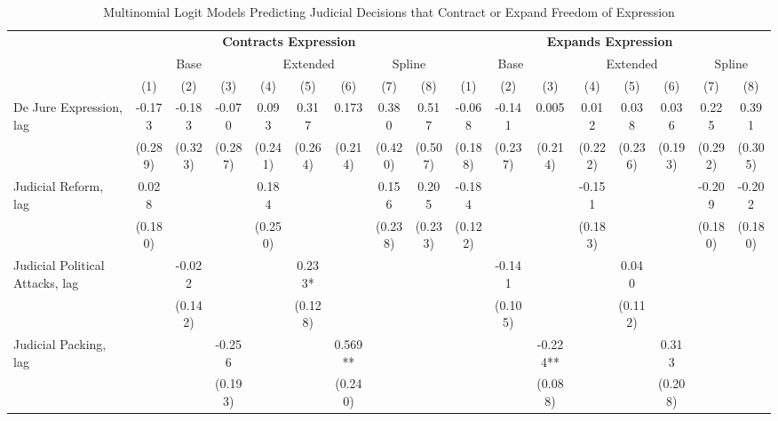 \begin{table}[htbp]
\centering

\caption{Multinomial Logit Models Predicting Judicial Decisions that Contract or Expand Freedom of Expression}
\label{tab:mnl_expression_main}

\scriptsize
\setlength{\tabcolsep}{2pt}
\begin{tabular}{lcccccccccccccccc}
\toprule

 & \multicolumn{8}{c}{\textbf{Contracts Expression}} & \multicolumn{8}{c}{\textbf{Expands Expression}} \\
\cmidrule(lr){2-9}
\cmidrule(lr){10-17}

 & \multicolumn{3}{c}{Base} & \multicolumn{3}{c}{Extended} & \multicolumn{2}{c}{Spline} & \multicolumn{3}{c}{Base} & \multicolumn{3}{c}{Extended} & \multicolumn{2}{c}{Spline} \\
\cmidrule(lr){2-4}
\cmidrule(lr){5-7}
\cmidrule(lr){8-9}
\cmidrule(lr){10-12}
\cmidrule(lr){13-15}
\cmidrule(lr){16-17}

 & (1) & (2) & (3) & (4) & (5) & (6) & (7) & (8) & (1) & (2) & (3) & (4) & (5) & (6) & (7) & (8) \\

\midrule

De Jure Expression, lag & -0.173 & -0.183 & -0.070 & 0.093 & 0.317 & 0.173 & 0.380 & 0.517 & -0.068 & -0.141 & 0.005 & 0.012 & 0.038 & 0.036 & 0.225 & 0.391 \\
\vspace{0.5cm}
 & (0.289) & (0.323) & (0.287) & (0.241) & (0.264) & (0.214) & (0.420) & (0.507) & (0.188) & (0.237) & (0.214) & (0.222) & (0.236) & (0.193) & (0.292) & (0.305) \\

Judicial Reform, lag & 0.028 &  &  & 0.184 &  &  & 0.156 & 0.205 & -0.184 &  &  & -0.151 &  &  & -0.209 & -0.202 \\
\vspace{0.1cm}
 & (0.180) &  &  & (0.250) &  &  & (0.238) & (0.233) & (0.122) &  &  & (0.183) &  &  & (0.180) & (0.180) \\

Judicial Political Attacks, lag &  & -0.022 &  &  & 0.233* &  &  &  &  & -0.141 &  &  & 0.040 &  &  &  \\
\vspace{0.1cm}
 &  & (0.142) &  &  & (0.128) &  &  &  &  & (0.105) &  &  & (0.112) &  &  &  \\

Judicial Packing, lag &  &  & -0.256 &  &  & 0.569** &  &  &  &  & -0.224** &  &  & 0.313 &  &  \\
\vspace{0.5cm}
 &  &  & (0.193) &  &  & (0.240) &  &  &  &  & (0.088) &  &  & (0.208) &  &  \\


\end{tabular}
\end{table}
